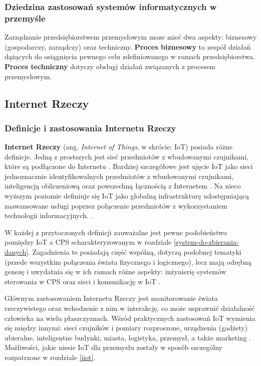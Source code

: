 \documentclass[a4paper, 12pt, twoside]{article}
\begin{document}
\subsubsection{Dziedzina zastosowań systemów informatycznych w przemyśle}

Zarządzanie przedsiębiorstwem przemysłowym moze mieć dwa aspekty: 
biznesowy (gospodarczy, zarządczy) oraz techniczny. 
\textbf{Proces biznesowy} to zespół działań dążących do osiągnięcia pewnego celu
zdefiniowanego w ramach przedsiębiorstwa. \textbf{Proces techniczny} dotyczy
obsługi działań związanych z procesem przemysłowym. 


\subsection{Internet Rzeczy}\label{iot}

\subsubsection{Definicje i zastosowania Internetu Rzeczy}

\textbf{Internet Rzeczy} (ang. \emph{Internet of Things}, w skrócie: IoT) posiada różne definicje. 
Jedną z prostszych jest sieć przedmiotów z wbudowanymi czujnikami, które są podłączone
do Internetu \cite{intro-to-iot}. Bardziej szczegółowe jest ujęcie IoT jako sieci jednoznacznie
identyfikowalnych przedmiotów z wbudowanymi czujnikami, inteligencją obliczeniową
oraz powszechną łącznością z Internetem \cite{iot-hype-to-reality}.
Na nieco wyższym poziomie definiuje się IoT jako globalną infrastrukturę udostępniającą
zaawansowane usługi poprzez połączenie przedmiotów z wykorzystaniem technologii informacyjnych.
\cite{intro-to-iot}. 

W każdej z przytoczonych
definicji zauważalne jest pewne podobieństwo pomiędzy IoT a CPS 
scharakteryzowanym w rozdziale \ref{system-do-zbierania-danych}. Zagadnienia te
posiadają część wspólną, dotyczą podobnej tematyki (przede wszystkim połączenia świata fizycznego i logicznego), 
lecz mają odrębną genezę i uwydatnia się w ich ramach różne aspekty: 
inżynierię systemów sterowania w CPS oraz sieci i komunikację w IoT \cite{cps-vs-iot}.

Głównym zastosowaniem Internetu Rzeczy jest monitorowanie świata rzeczywistego 
oraz wchodzenie z nim w interakcję, co może usprawnić działalność człowieka na wielu płaszczyznach.
Wśród praktycznych zastosowań IoT wymienia się między innymi:
sieci czujników i pomiary rozproszone, urządzenia (gadżety) ubieralne, 
inteligentne budynki, miasta, logistyka, przemysł, a także marketing \cite{internet-reczy}. 
Możliwości, jakie niesie IoT dla przemysłu zostały w sposób szczególny rozpatrzone 
w rozdziale \ref{iiot}.
\end{document}
